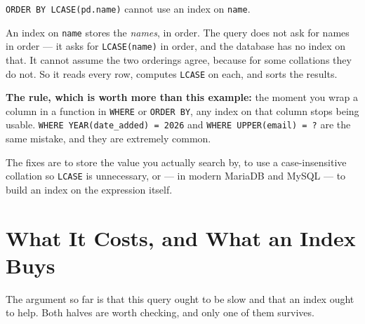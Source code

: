\begin{conceptbox}
\texttt{ORDER BY LCASE(pd.name)} cannot use an index on \texttt{name}.

\smallskip
An index on \texttt{name} stores the \emph{names}, in order. The query does not
ask for names in order --- it asks for \texttt{LCASE(name)} in order, and the
database has no index on that. It cannot assume the two orderings agree,
because for some collations they do not. So it reads every row, computes
\texttt{LCASE} on each, and sorts the results.

\smallskip
\textbf{The rule, which is worth more than this example:} the moment you wrap a
column in a function in \texttt{WHERE} or \texttt{ORDER BY}, any index on that
column stops being usable. \texttt{WHERE YEAR(date\_added) = 2026} and
\texttt{WHERE UPPER(email) = ?} are the same mistake, and they are extremely
common.

\smallskip
The fixes are to store the value you actually search by, to use a
case-insensitive collation so \texttt{LCASE} is unnecessary, or --- in modern
MariaDB and MySQL --- to build an index on the expression itself.
\end{conceptbox}

\section{What It Costs, and What an Index Buys}

The argument so far is that this query ought to be slow and that an index ought
to help. Both halves are worth checking, and only one of them survives.

